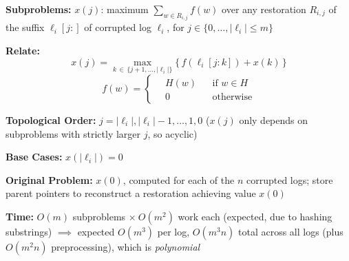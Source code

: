 \documentclass[12pt,twoside]{article}
\begin{document}
\begin{problems}
\textbf{Subproblems:} $x(j)$: maximum $\sum_{w \in R_{i,j}} f(w)$ over any restoration $R_{i,j}$ of the suffix $\ell_i[j:]$ of corrupted log $\ell_i$, for $j \in \{0,\dots,|\ell_i| \leq m\}$

\textbf{Relate:}
\[
x(j) = \max_{k \,\in\, \{j+1,\dots,|\ell_i|\}} \big\{\, f(\ell_i[j:k]) + x(k) \,\big\}
\]
\[
f(w) = \left\{\,
\begin{aligned}
&H(w) &&\text{if } w \in H \\
&0 &&\text{otherwise}
\end{aligned}
\right.
\]

\textbf{Topological Order:} $j = |\ell_i|, |\ell_i|-1, \dots, 1, 0$ ($x(j)$ only depends on subproblems with strictly larger $j$, so acyclic)

\textbf{Base Cases:} $x(|\ell_i|) = 0$

\textbf{Original Problem:} $x(0)$, computed for each of the $n$ corrupted logs; store parent pointers to reconstruct a restoration achieving value $x(0)$

\textbf{Time:} $O(m)$ subproblems $\times\ O(m^2)$ work each (expected, due to hashing substrings) $\implies$ expected $O(m^3)$ per log, $O(m^3 n)$ total across all logs (plus $O(m^2 n)$ preprocessing), which is \emph{polynomial}

\end{problems}
\end{document}

